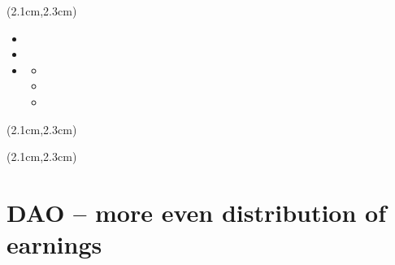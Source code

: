 \begin{preview}
\begin{textblock*}{5cm}(2.1cm,2.3cm) %
	{\color{red}{\large \textcircled{\small \themypage}}}
	\addtocounter{mypage}{1}
\end{textblock*}

\begin{minipage}{\textwidth}
	\setlength{\parskip}{0.4\baselineskip}

\begin{itemize}
	\item

	\item

	\item
	\begin{itemize}
		\item
		\item
		\item

	\end{itemize}
\end{itemize}


\end{minipage}
\end{preview}

\begin{preview}
\begin{textblock*}{5cm}(2.1cm,2.3cm) %
{\color{red}{\large \textcircled{\small \themypage}}}
\addtocounter{mypage}{1}
\end{textblock*}

\begin{minipage}{\textwidth}
\setlength{\parskip}{0.4\baselineskip}


\end{minipage}
\end{preview}

\begin{preview}
\begin{textblock*}{5cm}(2.1cm,2.3cm) %
	{\color{red}{\large \textcircled{\small \themypage}}}
	\addtocounter{mypage}{1}
\end{textblock*}

\begin{minipage}{\textwidth}
	\setlength{\parskip}{0.4\baselineskip}

\section{DAO -- more even distribution of earnings}

\end{minipage}
\end{preview}


